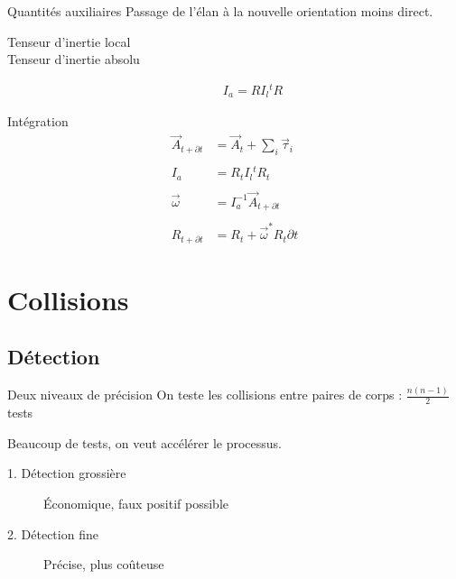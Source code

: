 \documentclass{beamer}
\newcommand{\deriv}{\partial \!}
\begin{document}
\begin{frame}{Quantités auxiliaires}
  Passage de l'élan à la nouvelle orientation moins direct.
  
  \begin{description}
  \item[Tenseur d'inertie local]
  \item[Tenseur d'inertie absolu]
    \begin{align*}
      I_a = R I_l {}^t\!\!R
    \end{align*}
  \item[]
  \end{description}
\end{frame}

\begin{frame}{Intégration}
  \begin{align*}
    \vec{A}_{t + \deriv t} &= \vec{A}_t + \sum_i \vec{\tau}_i \\ \\
    I_a &= R_t I_l {}^t\!\!R_t \\ \\
    \vec{\omega} &= I^{-1}_a \vec{A}_{t + \deriv t} \\ \\
    R_{t + \deriv t} &= R_t + \vec{\omega}^* R_t \deriv t
  \end{align*}
\end{frame}

\section{Collisions}

\subsection{Détection}

\begin{frame}{Deux niveaux de précision}
  On teste les collisions entre paires de corps : $\frac{n(n-1)}{2}$ tests

  \vfill

  Beaucoup de tests, on veut accélérer le processus.

  \vfill

  \begin{description}
  \item[1. Détection grossière] \'Economique, faux positif possible 
  \item[2. Détection fine] Précise, plus coûteuse
  \end{description}
\end{frame}
\end{document}
